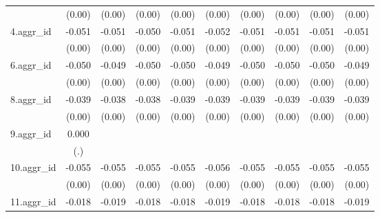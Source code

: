 {\begin{tabular}{l*{9}{c}}
          &   (0.00)         &   (0.00)         &   (0.00)         &   (0.00)         &   (0.00)         &   (0.00)         &   (0.00)         &   (0.00)         &   (0.00)         \\
[1em]
4.aggr\_id &   -0.051\sym{***}&   -0.051\sym{***}&   -0.050\sym{***}&   -0.051\sym{***}&   -0.052\sym{***}&   -0.051\sym{***}&   -0.051\sym{***}&   -0.051\sym{***}&   -0.051\sym{***}\\
          &   (0.00)         &   (0.00)         &   (0.00)         &   (0.00)         &   (0.00)         &   (0.00)         &   (0.00)         &   (0.00)         &   (0.00)         \\
[1em]
6.aggr\_id &   -0.050\sym{***}&   -0.049\sym{***}&   -0.050\sym{***}&   -0.050\sym{***}&   -0.049\sym{***}&   -0.050\sym{***}&   -0.050\sym{***}&   -0.050\sym{***}&   -0.049\sym{***}\\
          &   (0.00)         &   (0.00)         &   (0.00)         &   (0.00)         &   (0.00)         &   (0.00)         &   (0.00)         &   (0.00)         &   (0.00)         \\
[1em]
8.aggr\_id &   -0.039\sym{***}&   -0.038\sym{***}&   -0.038\sym{***}&   -0.039\sym{***}&   -0.039\sym{***}&   -0.039\sym{***}&   -0.039\sym{***}&   -0.039\sym{***}&   -0.039\sym{***}\\
          &   (0.00)         &   (0.00)         &   (0.00)         &   (0.00)         &   (0.00)         &   (0.00)         &   (0.00)         &   (0.00)         &   (0.00)         \\
[1em]
9.aggr\_id &    0.000         &                  &                  &                  &                  &                  &                  &                  &                  \\
          &      (.)         &                  &                  &                  &                  &                  &                  &                  &                  \\
[1em]
10.aggr\_id&   -0.055\sym{***}&   -0.055\sym{***}&   -0.055\sym{***}&   -0.055\sym{***}&   -0.056\sym{***}&   -0.055\sym{***}&   -0.055\sym{***}&   -0.055\sym{***}&   -0.055\sym{***}\\
          &   (0.00)         &   (0.00)         &   (0.00)         &   (0.00)         &   (0.00)         &   (0.00)         &   (0.00)         &   (0.00)         &   (0.00)         \\
[1em]
11.aggr\_id&   -0.018\sym{***}&   -0.019\sym{***}&   -0.018\sym{***}&   -0.018\sym{***}&   -0.019\sym{***}&   -0.018\sym{***}&   -0.018\sym{***}&   -0.018\sym{***}&   -0.019\sym{***}\\

\end{tabular}}

